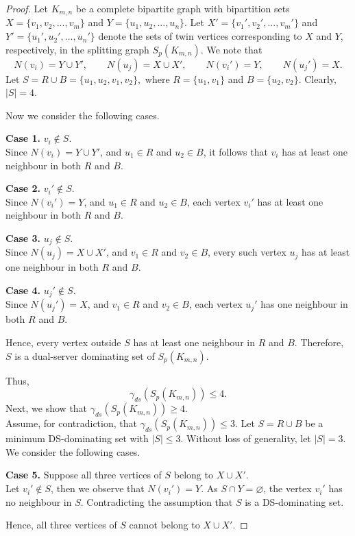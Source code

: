 \documentclass{article}
\begin{document}
\begin{proof}
Let $K_{m, n}$ be a complete bipartite graph with bipartition sets $X= \{v_1, v_2,..., v_m\}$ and $Y= \{u_1, u_2,..., u_n\}$. Let $X'= \{v_1', v_2',..., v_m'\}$ and $Y'= \{u_1', u_2',..., u_n'\}$ denote the sets of twin vertices corresponding to $X$ and $Y$, respectively, in the splitting graph $S_p(K_{m, n})$. We note that
\[
N(v_i)=Y\cup Y', \qquad
N(u_j)=X\cup X', \qquad
N(v_i')=Y, \qquad
N(u_j')=X.
\]
Let
$S=R\cup B=\{u_1,u_2,v_1,v_2\},
$
where
$
R=\{u_1,v_1\}$ and $ 
B=\{u_2,v_2\}.
$
Clearly, $|S|=4$.

Now we consider the following cases.

\textbf{Case 1.}
 $v_i\notin S$.\\ Since
$
N(v_i)=Y\cup Y'$, and  $u_1\in R$ and $u_2\in B$, it follows that $v_i$ has at least one
neighbour in both $R$ and $B$.

\textbf{Case 2.}
$v_i'\notin S$.\\ Since
$N(v_i')=Y$, and $u_1\in R$ and $u_2\in B$, each vertex $v_i'$ has at least one
neighbour in both $R$ and $B$.

\textbf{Case 3.}  $u_j\notin S$.\\ Since
$N(u_j)=X\cup X'$, and  $v_1\in R$ and $v_2\in B$, every such vertex $u_j$ has at least one
neighbour in both $R$ and $B$.

\textbf{Case 4.} $u_j'\notin S$.\\ Since $
N(u_j')=X$, and  $v_1\in R$ and $v_2\in B$, each vertex $u_j'$ has one neighbour in
both $R$ and $B$.

Hence, every vertex outside $S$ has at least one neighbour in $R$ and $B$. Therefore, $S$ is a dual-server dominating set  of
$S_p(K_{m,n})$.

Thus,
\[
\gamma_{ds}(S_p(K_{m,n}))\le 4.
\]
Next, we show that $
\gamma_{ds}(S_p(K_{m,n}))\ge 4$.\\
Assume, for contradiction, that $
\gamma_{ds}(S_p(K_{m,n}))\le 3$.
Let $
S=R\cup B$
be a minimum DS-dominating set  with $|S|\le 3$. Without loss of generality, let $|S|=3$. We consider the following cases.

\textbf{Case 5.}
Suppose all three vertices of $S$ belong to $X\cup X'$.\\
Let $v_i'\notin S$, then we observe that
$N(v_i')=Y$.
As $S\cap Y=\varnothing$, the vertex $v_i'$ has no neighbour in $S$.
Contradicting the assumption that $S$ is a DS-dominating set.

Hence, all three vertices of $S$ cannot belong to $X\cup X'$.


\end{proof}
\end{document}
